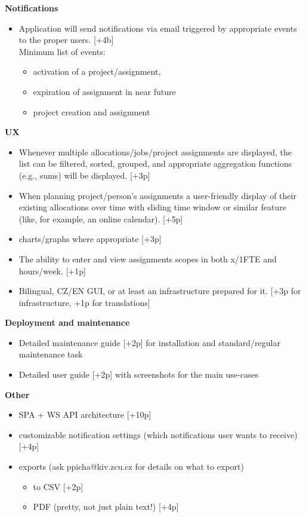 \documentclass[czech,P5]{thesiskiv}
\begin{document}
{\large \textbf{Notifications}}
\begin{itemize}
             \item Application will send notifications via email triggered by appropriate events to the proper users. [+4b] 
   		\\ Minimum list of events:
   	  \begin{itemize}
	             \item activation of a project/assignment, 
	             \item  expiration of assignment in near future 
	              \item project creation and assignment 
             \end{itemize}
\end{itemize}
{\large \textbf{UX}}
\begin{itemize}
             \item Whenever multiple allocations/jobs/project assignments are displayed, the list can be filtered, sorted, grouped, and appropriate aggregation functions (e.g., sums) will be displayed. [+3p] 
             \item When planning project/person’s assignments a user-friendly display of their existing allocations over time with sliding time window or similar feature (like, for example, an online calendar). [+5p] 
             \item charts/graphs where appropriate [+3p]
             \item The ability to enter and view assignments scopes in both x/1FTE and hours/week. [+1p] 
             \item Bilingual, CZ/EN GUI, or at least an infrastructure prepared for it. [+3p for infrastructure, +1p for translations] 
\end{itemize}
{\large \textbf{Deployment and maintenance}}
\begin{itemize}
             \item Detailed maintenance guide [+2p] for installation and standard/regular maintenance task 
             \item Detailed user guide [+2p] with screenshots for the main use-cases 
\end{itemize}
{\large \textbf{Other}}
\begin{itemize}
             \item SPA + WS API architecture [+10p] 
             \item customizable notification settings (which notifications user wants to receive) [+4p] 
             \item exports (ask ppicha@kiv.zcu.cz for details on what to export)  
             \begin{itemize}
	             \item to CSV [+2p] 
	             \item PDF (pretty, not just plain text!) [+4p] 
             \end{itemize}
\end{itemize}
\end{document}
